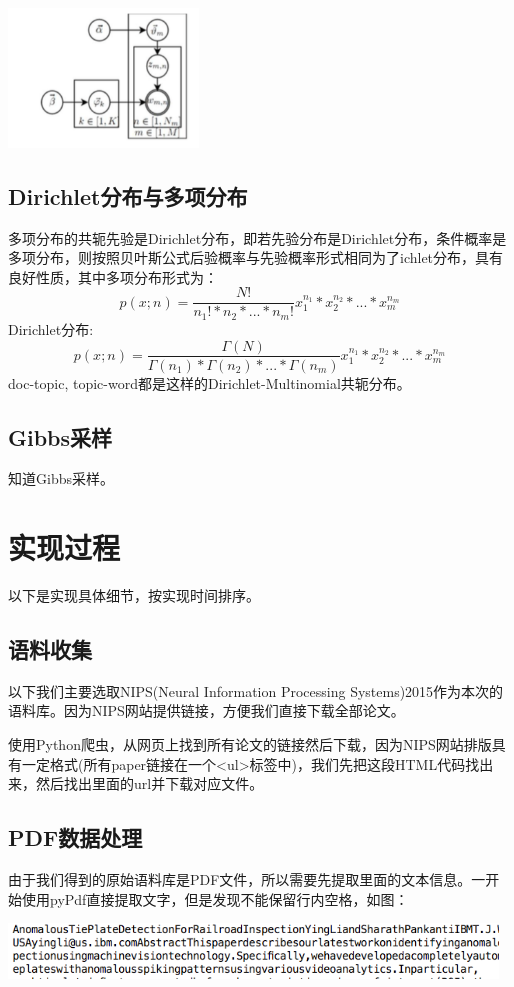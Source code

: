 \documentclass{article}
\begin{document}
\begin{center}
\includegraphics[height=3.7cm]{lda}
\end{center}

\subsection{Dirichlet分布与多项分布}
多项分布的共轭先验是Dirichlet分布，即若先验分布是Dirichlet分布，条件概率是多项分布，则按照贝叶斯公式后验概率与先验概率形式相同为了ichlet分布，具有良好性质，其中多项分布形式为：
\begin{displaymath}
p(x; n) = \frac{N!}{n_1! * n_2* ... *n_m!} x_1^{n_1} * x_2^{n_2} * ... * x_m^{n_m}
\end{displaymath}
Dirichlet分布:
\begin{displaymath}
p(x; n) = \frac{\Gamma(N)}{\Gamma(n_1) * \Gamma(n_2)* ... *\Gamma(n_m)} x_1^{n_1} * x_2^{n_2} * ... * x_m^{n_m}
\end{displaymath}
doc-topic, topic-word都是这样的Dirichlet-Multinomial共轭分布。

\subsection{Gibbs采样}
知道Gibbs采样。


\section{实现过程}
以下是实现具体细节，按实现时间排序。
\subsection{语料收集}
以下我们主要选取NIPS(Neural Information Processing Systems)2015作为本次的语料库。因为NIPS网站提供链接\cite{1}，方便我们直接下载全部论文。

使用Python爬虫，从网页上找到所有论文的链接然后下载，因为NIPS网站排版具有一定格式(所有paper链接在一个<ul>标签中)，我们先把这段HTML代码找出来，然后找出里面的url并下载对应文件。

\subsection{PDF数据处理}
由于我们得到的原始语料库是PDF文件，所以需要先提取里面的文本信息。一开始使用pyPdf直接提取文字，但是发现不能保留行内空格，如图：
\begin{center}
\includegraphics[width=13cm]{section3/1}
\end{center}
\end{document}
